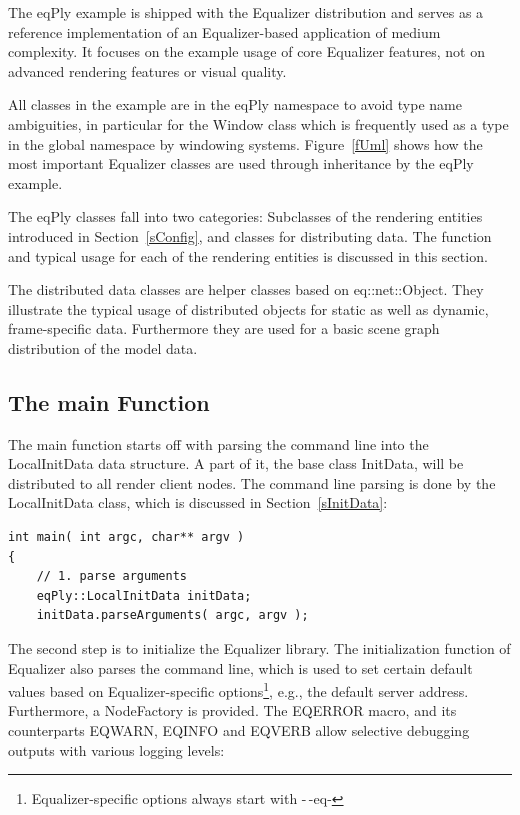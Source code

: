 \documentclass[10pt,a4]{scrartcl}
\newcommand{\fig}[1]{Figure~\ref{#1}}
\newcommand{\sref}[1]{Section~\ref{#1}}
\begin{document}
The \textsf{eqPly} example is shipped with the Equalizer distribution
and serves as a reference implementation of an Equalizer-based
application of medium complexity. It focuses on the example usage of
core Equalizer features, not on advanced rendering features or visual
quality.

All classes in the example are in the \textsf{eqPly} namespace to avoid
type name ambiguities, in particular for the \textsf{Window} class which
is frequently used as a type in the global namespace by windowing
systems. \fig{fUml} shows how the most important Equalizer classes are
used through inheritance by the \textsf{eqPly} example.

The \textsf{eqPly} classes fall into two categories: Subclasses of the
rendering entities introduced in \sref{sConfig}, and classes for
distributing data. The function and typical usage for each of the
rendering entities is discussed in this section.

The distributed data classes are helper classes based on
\textsf{eq::net::Object}. They illustrate the typical usage of distributed
objects for static as well as dynamic, frame-specific data. Furthermore
they are used for a basic scene graph distribution of the model data.


\subsection{The main Function}

The main function starts off with parsing the command line into the
\textsf{LocalInitData} data structure. A part of it, the base class
\textsf{InitData}, will be distributed to all render client nodes. The
command line parsing is done by the \textsf{LocalInitData} class, which
is discussed in \sref{sInitData}:

{\footnotesize\begin{lstlisting}
int main( int argc, char** argv )
{
    // 1. parse arguments
    eqPly::LocalInitData initData;
    initData.parseArguments( argc, argv );
\end{lstlisting}}

The second step is to initialize the Equalizer library. The
initialization function of Equalizer also parses the command line, which
is used to set certain default values based on Equalizer-specific
options\footnote{Equalizer-specific options always start with -\,-eq-},
e.g., the default server address. Furthermore, a \textsf{NodeFactory} is
provided. The \textsf{EQERROR} macro, and its counterparts
\textsf{EQWARN}, \textsf{EQINFO} and \textsf{EQVERB} allow selective
debugging outputs with various logging levels:
\end{document}
